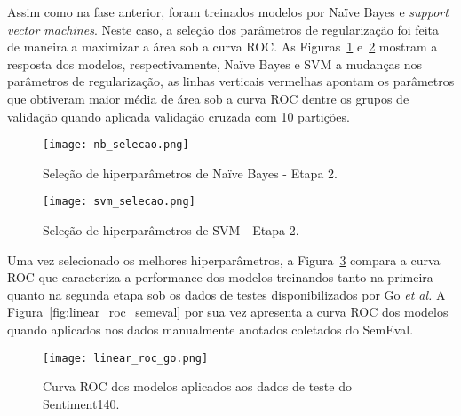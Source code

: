 Assim como na fase anterior, foram treinados modelos por Naïve Bayes e \textit{support vector machines}.
Neste caso, a seleção dos parâmetros de regularização foi feita de maneira a maximizar a área sob a curva ROC.
As Figuras~\ref{fig:nb_selecao} e~\ref{fig:svm_selecao} mostram a resposta dos modelos, respectivamente, Naïve Bayes e
SVM a mudanças nos parâmetros de regularização, as linhas verticais vermelhas apontam os parâmetros que obtiveram maior
média de área sob a curva ROC dentre os grupos de validação quando aplicada validação cruzada com 10 partições.

\begin{figure}
\begin{center} {
    \begin{center}
    \texttt{[image: nb\_selecao.png]}
    \caption{Seleção de hiperparâmetros de Naïve Bayes - Etapa 2.}
    \label{fig:nb_selecao}
    \end{center}
}
\end{center}
\end{figure}

\begin{figure}
\begin{center} {
    \begin{center}
    \texttt{[image: svm\_selecao.png]}
    \caption{Seleção de hiperparâmetros de SVM - Etapa 2.}
    \label{fig:svm_selecao}
    \end{center}
}
\end{center}
\end{figure}

Uma vez selecionado os melhores hiperparâmetros, a Figura~\ref{fig:linear_roc_go} compara a curva ROC que caracteriza a
performance dos modelos treinandos tanto na primeira quanto na segunda etapa sob os dados de testes disponibilizados
por Go \textit{et al.}
A Figura~\ref{fig:linear_roc_semeval} por sua vez apresenta a curva ROC dos modelos quando aplicados nos dados
manualmente anotados coletados do SemEval.

\begin{figure}
\begin{center} {
    \begin{center}
    \texttt{[image: linear\_roc\_go.png]}
    \caption{Curva ROC dos modelos aplicados aos dados de teste do Sentiment140.}
    \label{fig:linear_roc_go}
    \end{center}
}
\end{center}
\end{figure}

